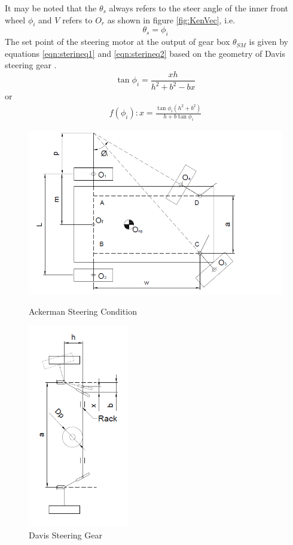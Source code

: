  It may be noted that the $\theta_s$ always refers to the steer angle of the inner front wheel $\phi_i$  and $V$ refers to $O_r$ as shown in figure \ref{fig:KenVec}, i.e.
 \begin{equation}
	 \theta_s =\phi_i
 \end{equation}
 The set point of the steering motor at the output of  gear box $\theta_{SM}$ is given by equations \ref{eqn:sterineq1} and \ref{eqn:sterineq2}  based on the geometry of Davis steering gear \cite{TOMBook}.
\begin{equation*}
 \tan\phi_i=\frac{xh}{h^2+b^2-bx}
\end{equation*}
or
\begin{eqnarray}
f(\phi_i): x=\frac{\tan\phi_i (h^2+b^2)}{h+b \tan\phi_i }
\label{eqn:sterineq1}
\end{eqnarray}
\begin{figure}
	\begin{minipage}[t]{0.6\textwidth}
		\centering
		\includegraphics[width=5in]{Chapter5/fig/kinvec} 
		\caption{Ackerman Steering Condition}\label{fig:KenVec}
	\end{minipage}
	\begin{minipage}[t]{0.7\textwidth}
		\centering
		\includegraphics[height=3.5in]{Chapter5/fig/davisgear} 
		\caption{Davis Steering Gear}\label{fig:steering_gear_train}
	\end{minipage}
\end{figure}
